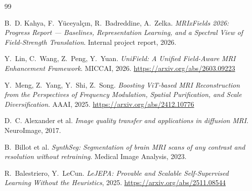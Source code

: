 \documentclass[11pt,a4paper]{article}
\begin{document}
\begin{thebibliography}{99}
\small

B.~D. Kahya, F.~Yüceyalç\i{}n, R.~Badreddine, A.~Zelka. \emph{MRIxFields 2026: Progress Report --- Baselines,
Representation Learning, and a Spectral View of Field-Strength Translation}. Internal project report,
2026.

Y.~Lin, C.~Wang, Z.~Peng, Y.~Yuan. \emph{UniField: A Unified Field-Aware MRI Enhancement Framework}.
MICCAI, 2026. \url{https://arxiv.org/abs/2603.09223}

Y.~Meng, Z.~Yang, Y.~Shi, Z.~Song. \emph{Boosting ViT-based MRI Reconstruction from the Perspectives of
Frequency Modulation, Spatial Purification, and Scale Diversification}. AAAI, 2025.
\url{https://arxiv.org/abs/2412.10776}

D.~C. Alexander et al. \emph{Image quality transfer and applications in diffusion MRI}. NeuroImage, 2017.

B.~Billot et al. \emph{SynthSeg: Segmentation of brain MRI scans of any contrast and resolution without
retraining}. Medical Image Analysis, 2023.

R.~Balestriero, Y.~LeCun. \emph{LeJEPA: Provable and Scalable Self-Supervised Learning Without the
Heuristics}, 2025. \url{https://arxiv.org/abs/2511.08544}

\end{thebibliography}
\end{document}
